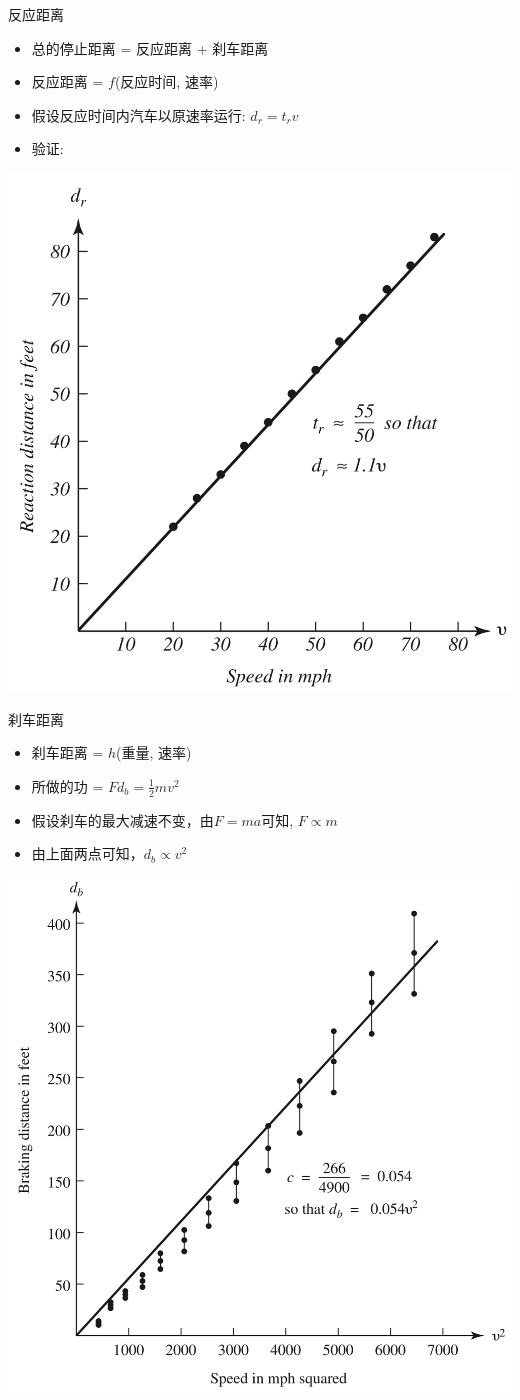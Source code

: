 \documentclass[UTF8]{ctexbeamer}
\begin{document}
\begin{frame}{反应距离}

  \begin{itemize}
  \item 总的停止距离 = 反应距离 + 刹车距离
  \item 反应距离 = $f$(反应时间, 速率)
  \item 假设反应时间内汽车以原速率运行: $d_r = t_rv$
  \item 验证:
  \end{itemize}

  \begin{center}
    \includegraphics[width=.4\textwidth{}]{dr.png}
  \end{center}
\end{frame}

\begin{frame}{刹车距离}

  \begin{itemize}
  \item 刹车距离 = $h$(重量, 速率)
  \item 所做的功 = $Fd_b=\frac{1}{2}mv^2$
  \item 假设刹车的最大减速不变，由$F=ma$可知, $F \propto m$
  \item 由上面两点可知，$d_b \propto v^2$
  \end{itemize}

  \begin{center}
    \includegraphics[width=.4\textwidth{}]{db.png}
  \end{center}
  
\end{frame}
\end{document}
